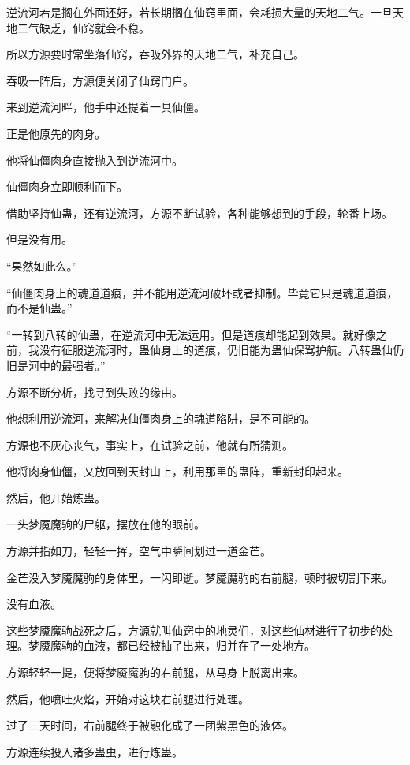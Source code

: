 
\begin{this_body}

逆流河若是搁在外面还好，若长期搁在仙窍里面，会耗损大量的天地二气。一旦天地二气缺乏，仙窍就会不稳。

所以方源要时常坐落仙窍，吞吸外界的天地二气，补充自己。

吞吸一阵后，方源便关闭了仙窍门户。

来到逆流河畔，他手中还提着一具仙僵。

正是他原先的肉身。

他将仙僵肉身直接抛入到逆流河中。

仙僵肉身立即顺利而下。

借助坚持仙蛊，还有逆流河，方源不断试验，各种能够想到的手段，轮番上场。

但是没有用。

“果然如此么。”

“仙僵肉身上的魂道道痕，并不能用逆流河破坏或者抑制。毕竟它只是魂道道痕，而不是仙蛊。”

“一转到八转的仙蛊，在逆流河中无法运用。但是道痕却能起到效果。就好像之前，我没有征服逆流河时，蛊仙身上的道痕，仍旧能为蛊仙保驾护航。八转蛊仙仍旧是河中的最强者。”

方源不断分析，找寻到失败的缘由。

他想利用逆流河，来解决仙僵肉身上的魂道陷阱，是不可能的。

方源也不灰心丧气，事实上，在试验之前，他就有所猜测。

他将肉身仙僵，又放回到天封山上，利用那里的蛊阵，重新封印起来。

然后，他开始炼蛊。

一头梦魇魔驹的尸躯，摆放在他的眼前。

方源并指如刀，轻轻一挥，空气中瞬间划过一道金芒。

金芒没入梦魇魔驹的身体里，一闪即逝。梦魇魔驹的右前腿，顿时被切割下来。

没有血液。

这些梦魇魔驹战死之后，方源就叫仙窍中的地灵们，对这些仙材进行了初步的处理。梦魇魔驹的血液，都已经被抽了出来，归并在了一处地方。

方源轻轻一提，便将梦魇魔驹的右前腿，从马身上脱离出来。

然后，他喷吐火焰，开始对这块右前腿进行处理。

过了三天时间，右前腿终于被融化成了一团紫黑色的液体。

方源连续投入诸多蛊虫，进行炼蛊。


\end{this_body}
